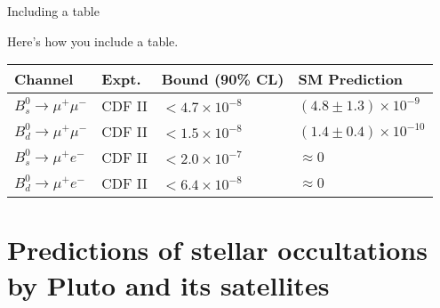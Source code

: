 \begin{frame}[c]{Including a table}
	
	Here's how you include a table.
	\vspace{1em}
	
	\footnotesize	
		\begin{tabular}{llll}\hline 
		\textbf{Channel} & \textbf{Expt.} & \textbf{Bound (90\% CL)} & \textbf{SM Prediction} \\ \hline
		\textcolor{FlipGreen}{$B^0_s \to \mu^+ \mu^-$} & \textcolor{FlipGreen}{CDF II}
		                  & \textcolor{FlipGreen}{$<4.7\times 10^{-8}$}
		                  & \textcolor{FlipGreen}{$(4.8\pm 1.3) \times 10^{-9}$} \\ 
		$B^0_d \to \mu^+ \mu^-$ & CDF II
		                  & $<1.5\times 10^{-8}$
		                  & $(1.4\pm 0.4) \times 10^{-10}$  \\ 
		\hline
		$B^0_s \to \mu^+ e^-$ & CDF II
		                  & $<2.0\times 10^{-7}$
		                  & $\approx 0$ \\ 
		$B^0_d \to \mu^+ e^-$ & CDF II
		                  & $<6.4 \times 10^{-8}$
		                  & $\approx 0$ \\
		\hline 
		\end{tabular}
		\vspace{1em}
		
		\normalsize
\end{frame}


\section{Predictions of stellar occultations by Pluto and its satellites}

